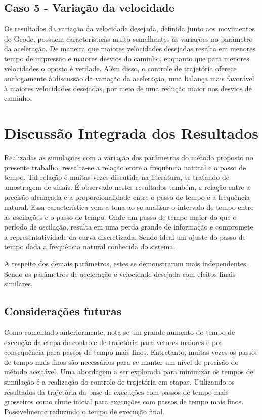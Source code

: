 \subsection{Caso 5 - Variação da velocidade}
Os resultados da variação da velocidade desejada, definida junto aos movimentos do Gcode, possuem características muito semelhantes às variações no parâmetro da aceleração. De maneira que maiores velocidades desejadas resulta em menores tempo de impressão e maiores desvios do caminho, enquanto que para menores velocidades o oposto é verdade. Além disso, o controle de trajetória oferece analogamente à discussão da variação da aceleração, uma balança mais favorável à maiores velocidades desejadas, por meio de uma redução maior nos desvios de caminho.

\section{Discussão Integrada dos Resultados}
Realizadas as simulações com a variação dos parâmetros do método proposto no presente trabalho, ressalta-se a relação entre a frequência natural e o passo de tempo. Tal relação é muitas vezes discutida na literatura, se tratando de amostragem de sinais. É observado nestes resultados também, a relação entre a precisão alcançada e a proporcionalidade entre o passo de tempo e a frequência natural. Essa característica vem a tona ao se analisar o intervalo de tempo entre as oscilações e o passo de tempo. Onde um passo de tempo maior do que o período de oscilação, resulta em uma perda grande de informação e compromete a representatividade da curva discretizada. Sendo ideal um ajuste do passo de tempo dada a frequência natural conhecida do sistema.

A respeito dos demais parâmetros, estes se demonstraram mais independentes. Sendo os parâmetros de aceleração e velocidade desejada com efeitos finais similares.

\subsection{Considerações futuras}
Como comentado anteriormente, nota-se um grande aumento do tempo de execução da etapa de controle de trajetória para vetores maiores e por consequência para passos de tempo mais finos. Entretanto, muitas vezes os passos de tempo mais finos são necessários para se manter um nível de precisão do método aceitável. Uma abordagem a ser explorada para minimizar os tempos de simulação é a realização do controle de trajetória em etapas. Utilizando os resultados da trajetória da base de execuções com passos de tempo mais grosseiros como chute inicial para execuções com passos de tempo mais finos. Possivelmente reduzindo o tempo de execução final.

